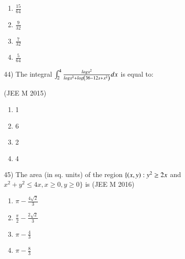 \documentclass[journal,12pt,twocolumn]{IEEEtran}
\theoremstyle{remark}
\begin{document}
		\begin{multicols}{4}
			\begin{enumerate}[label=(\alph*)]
				\item $\frac{15}{64}$
				\item $\frac{9}{32}$
				\item $\frac{7}{32}$
				\item $\frac{5}{64}$
			\end{enumerate}
		\end{multicols}

44)
	The integral $\int_2^4\frac{log x^2}{log x^2 + log\left(36-12x+x^2\right)}dx$ is equal to:

		\hfill{(JEE M 2015)}

		\begin{multicols}{4}
			\begin{enumerate}[label=(\alph*)]
				\item 1
				\item 6
				\item 2
				\item 4
			\end{enumerate}
		\end{multicols}

45)
	 The area (in sq. units) of the region $\{\left(x,y\right):y^2\geq2x$ and $x^2+y^2\leq4x, x\geq0, y\geq0\}$ is
		\hfill{(JEE M 2016)}

		\begin{multicols}{2}
			\begin{enumerate}[label=(\alph*)]
				\item $\pi-\frac{4\sqrt{2}}{3}$
				\item $\frac{\pi}{2}-\frac{2\sqrt{2}}{3}$
				\item $\pi-\frac{4}{3}$
				\item $\pi-\frac{8}{3}$ 
			\end{enumerate}
		\end{multicols} 
\end{document}
